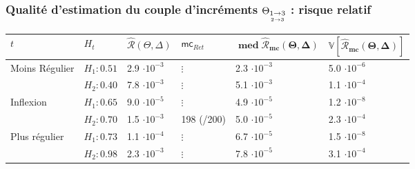 \bigskip

\subsubsection{Qualité d'estimation du couple d'incréments $\Theta_{\underset{2 \rightarrow 3}{1 \rightarrow 3}}$ : risque relatif}

\begin{table}[H]
	\centering
	\begin{tabularx}{\linewidth}{|X|X|XX|X|X|}
		\toprule
		$t$                                  & $H_t$        & $\widehat{\mathcal R}(\Theta, \Delta)$ & $\textsf{mc}_{Ret}$ & $\mathbf{\operatorname{med}\widehat{\mathcal R}_{mc}(\Theta, \Delta)}$ & $\mathbf{\mathds V[\widehat{\mathcal R}_{mc}(\Theta, \Delta)]}$ \\
		\midrule
		\multirow{2}{\hsize}{Moins Régulier} & $H_1 : 0.51$ & 2.9 $\cdot 10^{-3}$                    & $\vdots$            & 2.3 $\cdot 10^{-3}$                                                      & 5.0 $\cdot 10^{-6}$
		\\
		                                     & $H_2 : 0.40$ & 7.8 $\cdot 10^{-3}$                    & $\vdots$            & 5.1 $\cdot 10^{-3}$                                                      & 1.1 $\cdot 10^{-4}$
		\\
		\midrule
		\multirow{2}{\hsize}{Inflexion}      & $H_1 : 0.65$ & 9.0 $\cdot 10^{-5}$                    & $\vdots$            & 4.9 $\cdot 10^{-5}$                                                      & 1.2 $\cdot 10^{-8}$
		\\
		                                     & $H_2 : 0.70$ & 1.5 $\cdot 10^{-3}$                    & 198 (/200)          & 5.0 $\cdot 10^{-5}$                                                      & 2.3 $\cdot 10^{-4}$
		\\
		\midrule
		\multirow{2}{\hsize}{Plus régulier}  & $H_1 : 0.73$ & 1.1 $\cdot 10^{-4}$                    & $\vdots$            & 6.7 $\cdot 10^{-5}$                                                      & 1.5 $\cdot 10^{-8}$
		\\
		                                     & $H_2 : 0.98$ & 2.3 $\cdot 10^{-3}$                    & $\vdots$            & 7.8 $\cdot 10^{-5}$                                                      & 3.1 $\cdot 10^{-4}$
		\\
		\bottomrule
	\end{tabularx}
\end{table}



